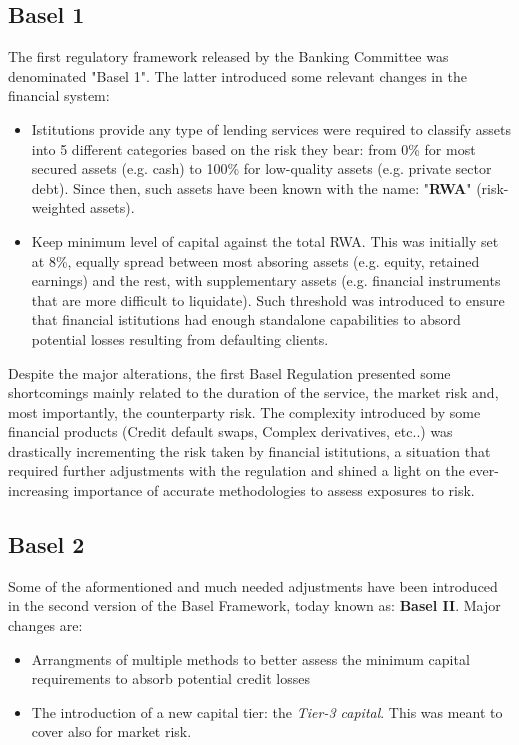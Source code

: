 \documentclass[a4paper,12pt]{article}
\begin{document}
    \subsection[]{Basel 1}
    The first regulatory framework released by the Banking Committee was denominated "Basel 1". The latter introduced some relevant changes in the financial system:
    
        \begin{itemize}
            \item Istitutions provide any type of lending services were required to classify assets into 5 different categories based on the risk they bear: from 0\% for most secured assets (e.g. cash) to 100\% for low-quality assets (e.g. private sector debt). Since then, such assets have been known with the name: "\textbf{RWA}" (risk-weighted assets).
            \item Keep minimum level of capital against the total RWA. This was initially set at 8\%, equally spread between most absoring assets (e.g. equity, retained earnings) and the rest, with supplementary assets (e.g. financial instruments that are more difficult to liquidate). Such threshold was introduced to ensure that financial istitutions had enough standalone capabilities to absord potential losses resulting from defaulting clients.
        \end{itemize}

    Despite the major alterations, the first Basel Regulation presented some shortcomings mainly related to the duration of the service, the market risk and, most importantly, the counterparty risk. The complexity 
    introduced by some financial products (Credit default swaps, Complex derivatives, etc..) was drastically incrementing the risk taken by financial istitutions, a situation that required further 
    adjustments with the regulation and shined a light on the ever-increasing importance of accurate methodologies to assess exposures to risk. 
     
    \subsection[]{Basel 2}
    Some of the aformentioned and much needed adjustments have been introduced in the second version of the Basel Framework, today known as: \textbf{Basel II}. Major changes are:

        \begin{itemize}
            \item Arrangments of multiple methods to better assess the minimum capital requirements to absorb potential credit losses 
            \item The introduction of a new capital tier: the \textit{Tier-3 capital}. This was meant to cover also for market risk.
        \end{itemize}
\end{document}
